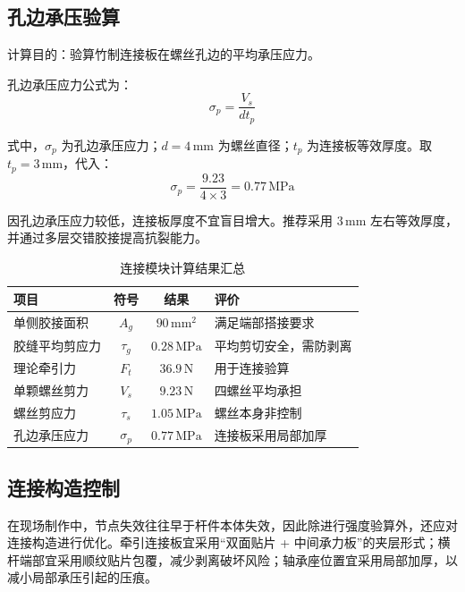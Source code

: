 \documentclass[UTF8,a4paper,12pt,fontset=none]{ctexart}
\numberwithin{equation}{section}
\numberwithin{figure}{section}
\numberwithin{table}{section}
\newcommand{\mm}{\,\mathrm{mm}}
\newcommand{\Nunit}{\,\mathrm{N}}
\newcommand{\MPa}{\,\mathrm{MPa}}
\begin{document}
\subsection{孔边承压验算}
计算目的：验算竹制连接板在螺丝孔边的平均承压应力。

孔边承压应力公式为：
\begin{equation}
  \sigma_p=\frac{V_s}{dt_p}
\end{equation}

式中，$\sigma_p$ 为孔边承压应力；$d=4\mm$ 为螺丝直径；$t_p$ 为连接板等效厚度。取 $t_p=3\mm$，代入：
\begin{equation}
  \sigma_p=\frac{9.23}{4\times3}=0.77\MPa
\end{equation}

因孔边承压应力较低，连接板厚度不宜盲目增大。推荐采用 $3\mm$ 左右等效厚度，并通过多层交错胶接提高抗裂能力。

\begin{table}[H]
\centering
\caption{连接模块计算结果汇总}
\label{tab:joint-summary}
\begin{tabularx}{\linewidth}{l c c Y}
\toprule
项目 & 符号 & 结果 & 评价 \\
\midrule
单侧胶接面积 & $A_g$ & $90\mm^2$ & 满足端部搭接要求 \\
胶缝平均剪应力 & $\tau_g$ & $0.28\MPa$ & 平均剪切安全，需防剥离 \\
理论牵引力 & $F_t$ & $36.9\Nunit$ & 用于连接验算 \\
单颗螺丝剪力 & $V_s$ & $9.23\Nunit$ & 四螺丝平均承担 \\
螺丝剪应力 & $\tau_s$ & $1.05\MPa$ & 螺丝本身非控制 \\
孔边承压应力 & $\sigma_p$ & $0.77\MPa$ & 连接板采用局部加厚 \\
\bottomrule
\end{tabularx}
\end{table}

\subsection{连接构造控制}
在现场制作中，节点失效往往早于杆件本体失效，因此除进行强度验算外，还应对连接构造进行优化。牵引连接板宜采用“双面贴片 + 中间承力板”的夹层形式；横杆端部宜采用顺纹贴片包覆，减少剥离破坏风险；轴承座位置宜采用局部加厚，以减小局部承压引起的压痕。
\end{document}
